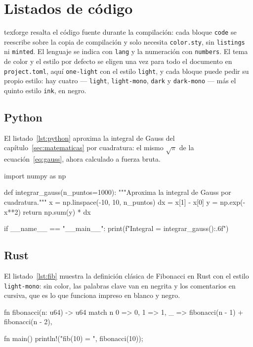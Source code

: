 \section{Listados de código}\label{sec:codigo}

texforge resalta el código fuente durante la compilación: cada bloque
\texttt{code} se reescribe sobre la copia de compilación y solo necesita
\texttt{color.sty}, sin \texttt{listings} ni \texttt{minted}. El lenguaje se
indica con \texttt{lang} y la numeración con \texttt{numbers}. El tema de
color y el estilo por defecto se eligen una vez para todo el documento en
\texttt{project.toml}, aquí \texttt{one-light} con el estilo
\texttt{light}, y cada bloque puede pedir su propio estilo: hay
cuatro --- \texttt{light}, \texttt{light-mono}, \texttt{dark} y
\texttt{dark-mono} --- más el quinto estilo \texttt{ink}, en negro.

\subsection{Python}

El listado~\ref{lst:python} aproxima la integral de Gauss del
capítulo~\ref{sec:matematicas} por cuadratura: el mismo $\sqrt{\pi}$ de la
ecuación~\eqref{eq:gauss}, ahora calculado a fuerza bruta.

\begin{code}[lang=python, numbers=true, caption={Cuadratura de la integral de Gauss}, label={lst:python}]
import numpy as np

def integrar_gauss(n_puntos=1000):
    """Aproxima la integral de Gauss por cuadratura."""
    x = np.linspace(-10, 10, n_puntos)
    dx = x[1] - x[0]
    y = np.exp(-x**2)
    return np.sum(y) * dx

if __name__ == "__main__":
    print(f"Integral = {integrar_gauss():.6f}")
\end{code}

\subsection{Rust}

El listado~\ref{lst:fib} muestra la definición clásica de Fibonacci en
Rust con el estilo \texttt{light-mono}: sin color, las palabras clave van en
negrita y los comentarios en cursiva, que es lo que funciona impreso en
blanco y negro.

\begin{code}[lang=rust, style=light-mono, numbers=true, caption={Fibonacci en Rust}, label={lst:fib}]
fn fibonacci(n: u64) -> u64 {
    match n {
        0 => 0,
        1 => 1,
        _ => fibonacci(n - 1) + fibonacci(n - 2),
    }
}

fn main() {
    println!("fib(10) = {}", fibonacci(10));
}
\end{code}

